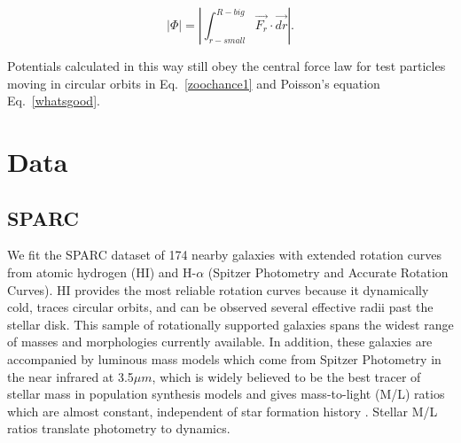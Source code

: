 \documentclass[reprint,%
 amsmath,amssymb,
 aps,
]{revtex4-1}
\begin{document}
 \begin{equation}
    | \Phi | = \left|  \int^{R-big}_{r-small} \vec{F_r}\cdot\vec{dr}\right|.
      \label{eq:Newt2}
      \end{equation}
 
 

   
 Potentials calculated in this way still obey the central force law for test particles moving in circular orbits in Eq.~\ref{zoochance1} and Poisson's equation Eq.~\ref{whatsgood}.
   
 

 
    
% 
\section{Data \label{sec:data}}
 
 \subsection{SPARC }
 We fit the SPARC dataset  of  174 nearby galaxies with extended rotation curves from atomic hydrogen (HI)  and H-$\alpha$ (Spitzer Photometry and Accurate Rotation Curves)\cite{2016Lelli}. HI provides the most reliable
 rotation curves because it dynamically cold, traces circular orbits, and can be observed several effective radii past the stellar disk. This sample of rotationally supported galaxies   spans the widest range of masses and morphologies currently available. In addition, these galaxies are  accompanied by luminous mass models which come from   Spitzer Photometry in the 
   near infrared  at 3.5$\mu m$, which is widely believed to be the best tracer of stellar mass   in population synthesis models and   gives mass-to-light (M/L) ratios which are almost constant, independent of star formation history \cite{BelldYong,10.1093/mnras/sty3223}.  Stellar M/L ratios   translate   photometry to dynamics. 
   
\end{document}
